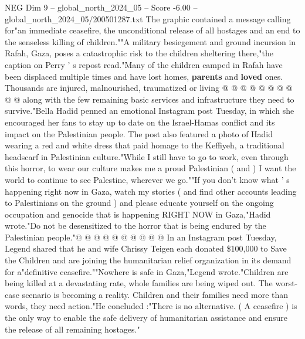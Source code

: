 \begin{textsample}{NEG Dim 9 – global\_north\_2024\_05 – Score -6.00 – global\_north\_2024\_05/200501287.txt}
The graphic contained a message calling for"an immediate ceasefire, the unconditional release of all hostages and an end to the senseless killing of children.""A military besiegement and ground incursion in Rafah, Gaza, poses a catastrophic risk to the children sheltering there,"the caption on Perry ' s repost read."Many of the children camped in Rafah have been displaced multiple times and have lost homes, \textbf{parents} and \textbf{loved} ones.
Thousands are injured, malnourished, traumatized or living @ @ @ @ @ @ @ @ @ @ along with the few remaining basic services and infrastructure they need to survive."Bella Hadid penned an emotional Instagram post Tuesday, in which she encouraged her fans to stay up to date on the Israel-Hamas conflict and its impact on the Palestinian people.
The post also featured a photo of Hadid wearing a red and white dress that paid homage to the Keffiyeh, a traditional headscarf in Palestinian culture."While I still have to go to work, even through this horror, to wear our culture makes me a proud Palestinian ( and ) I want the world to continue to see Palestine, wherever we go.""If you don't know what ' s happening right now in Gaza, watch my stories ( and find other accounts leading to Palestinians on the ground ) and please educate yourself on the ongoing occupation and genocide that is happening RIGHT NOW in Gaza,"Hadid wrote."Do not be desensitized to the horror that is being endured by the Palestinian people."@ @ @ @ @ @ @ @ @ @ In an Instagram post Tuesday, Legend shared that he and wife Chrissy Teigen each donated \$100,000 to Save the Children and are joining the humanitarian relief organization in its demand for a"definitive ceasefire.""Nowhere is safe in Gaza,"Legend wrote."Children are being killed at a devastating rate, whole families are being wiped out.
The worst-case scenario is becoming a reality.
Children and their families need more than words, they need action."He concluded :"There is no alternative. ( A ceasefire ) is the only way to enable the safe delivery of humanitarian assistance and ensure the release of all remaining hostages."

\end{textsample}
